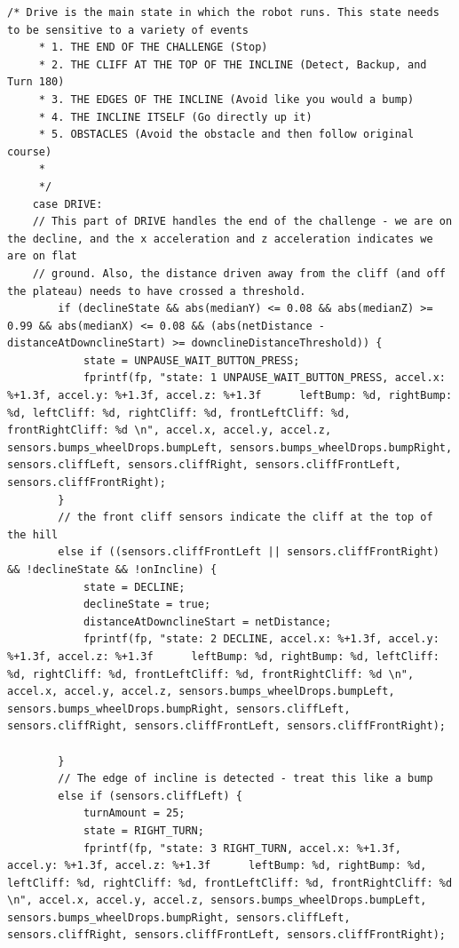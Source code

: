 \documentclass[twoside]{article}
\begin{document}
\begin{lstlisting}[mathescape, frame=single]
    /* Drive is the main state in which the robot runs. This state needs to be sensitive to a variety of events
     * 1. THE END OF THE CHALLENGE (Stop)
     * 2. THE CLIFF AT THE TOP OF THE INCLINE (Detect, Backup, and Turn 180)
     * 3. THE EDGES OF THE INCLINE (Avoid like you would a bump)
     * 4. THE INCLINE ITSELF (Go directly up it)
     * 5. OBSTACLES (Avoid the obstacle and then follow original course)
     *
     */
    case DRIVE:
	// This part of DRIVE handles the end of the challenge - we are on the decline, and the x acceleration and z acceleration indicates we are on flat
	// ground. Also, the distance driven away from the cliff (and off the plateau) needs to have crossed a threshold. 
		if (declineState && abs(medianY) <= 0.08 && abs(medianZ) >= 0.99 && abs(medianX) <= 0.08 && (abs(netDistance - distanceAtDownclineStart) >= downclineDistanceThreshold)) {
            state = UNPAUSE_WAIT_BUTTON_PRESS;
            fprintf(fp, "state: 1 UNPAUSE_WAIT_BUTTON_PRESS, accel.x: %+1.3f, accel.y: %+1.3f, accel.z: %+1.3f      leftBump: %d, rightBump: %d, leftCliff: %d, rightCliff: %d, frontLeftCliff: %d, frontRightCliff: %d \n", accel.x, accel.y, accel.z, sensors.bumps_wheelDrops.bumpLeft, sensors.bumps_wheelDrops.bumpRight, sensors.cliffLeft, sensors.cliffRight, sensors.cliffFrontLeft, sensors.cliffFrontRight);
        }
        // the front cliff sensors indicate the cliff at the top of the hill
		else if ((sensors.cliffFrontLeft || sensors.cliffFrontRight) && !declineState && !onIncline) {
            state = DECLINE;
            declineState = true;
            distanceAtDownclineStart = netDistance;
            fprintf(fp, "state: 2 DECLINE, accel.x: %+1.3f, accel.y: %+1.3f, accel.z: %+1.3f      leftBump: %d, rightBump: %d, leftCliff: %d, rightCliff: %d, frontLeftCliff: %d, frontRightCliff: %d \n", accel.x, accel.y, accel.z, sensors.bumps_wheelDrops.bumpLeft, sensors.bumps_wheelDrops.bumpRight, sensors.cliffLeft, sensors.cliffRight, sensors.cliffFrontLeft, sensors.cliffFrontRight);

        }
		// The edge of incline is detected - treat this like a bump
        else if (sensors.cliffLeft) {
            turnAmount = 25;
            state = RIGHT_TURN;
            fprintf(fp, "state: 3 RIGHT_TURN, accel.x: %+1.3f, accel.y: %+1.3f, accel.z: %+1.3f      leftBump: %d, rightBump: %d, leftCliff: %d, rightCliff: %d, frontLeftCliff: %d, frontRightCliff: %d \n", accel.x, accel.y, accel.z, sensors.bumps_wheelDrops.bumpLeft, sensors.bumps_wheelDrops.bumpRight, sensors.cliffLeft, sensors.cliffRight, sensors.cliffFrontLeft, sensors.cliffFrontRight);


\end{lstlisting}
\end{document}
